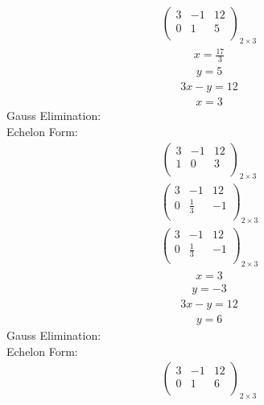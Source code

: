 \documentclass{article}
\begin{document}
\begin{align*}
\left(
\begin{array}{cc|c}
3 & -1 & 12\\
0 & 1 & 5\\
\end{array}
\right)_{2\times 3}
\end{align*}
\begin{align*}
x=\frac{17}{3}\end{align*}
\begin{align*}
y=5\end{align*}
\begin{align*}
3x - y=12\end{align*}
\begin{align*}
x=3\end{align*}
Gauss Elimination:\\
Echelon Form:\\
\begin{align*}
\left(
\begin{array}{cc|c}
3 & -1 & 12\\
1 & 0 & 3\\
\end{array}
\right)_{2\times 3}
\end{align*}
\begin{align*}
\left(
\begin{array}{cc|c}
3 & -1 & 12\\
0 & \frac{1}{3} & -1\\
\end{array}
\right)_{2\times 3}
\end{align*}
\begin{align*}
\left(
\begin{array}{cc|c}
3 & -1 & 12\\
0 & \frac{1}{3} & -1\\
\end{array}
\right)_{2\times 3}
\end{align*}
\begin{align*}
x=3\end{align*}
\begin{align*}
y=-3\end{align*}
\begin{align*}
3x - y=12\end{align*}
\begin{align*}
y=6\end{align*}
Gauss Elimination:\\
Echelon Form:\\
\begin{align*}
\left(
\begin{array}{cc|c}
3 & -1 & 12\\
0 & 1 & 6\\
\end{array}
\right)_{2\times 3}
\end{align*}
\end{document}
